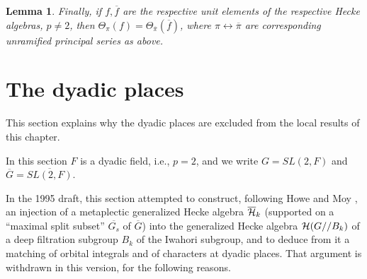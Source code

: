 \documentclass[12pt,letterpaper]{book}
\theoremstyle{plain}
\newtheorem{lemma}[theorem]{Lemma}
\theoremstyle{definition}
\theoremstyle{remark}
\theoremstyle{remark}
\begin{document}
\begin{lemma}
Finally, if $f,\overline{f}$ are the respective unit elements
of the respective Hecke algebras, $p\not= 2$, then
$\Theta_\pi(f)=\Theta_{\overline{\pi}}(\overline{f})$,
where
$\pi \leftrightarrow \overline{\pi}$ are corresponding
unramified principal series as above.
\end{lemma}

\section{The dyadic places}\label{sec:dyadic}

This section explains why the dyadic places are excluded from the local results of this chapter.


In this section $F$ is a dyadic field, i.e., $p=2$, and we write
$G=SL(2,F)$ and $\overline{G}=\overline{SL(2,F)}$.

In the 1995 draft, this section attempted to construct, following
Howe and Moy \cite[ch.~3]{HM}, an injection of a metaplectic generalized
Hecke algebra $\overline{\cal H}_k$ (supported on a ``maximal split
subset'' $\overline{G_s}$ of $\overline{G}$) into the generalized Hecke
algebra ${\cal H}(G//B_k)$ of a deep filtration subgroup $B_k$ of the
Iwahori subgroup, and to deduce from it a matching of orbital integrals
and of characters at dyadic places. That argument is withdrawn in this
version, for the following reasons.
\end{document}
